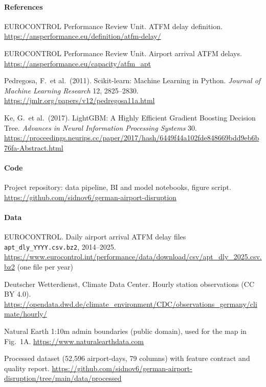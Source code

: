 \documentclass[10pt,a4paper,epsf,apalike]{article}
\newcommand{\repo}{https://github.com/sidnov6/german-airport-disruption}
\begin{document}
\paragraph{References}
\begin{enumerate}[label={[\arabic*]}]
\item EUROCONTROL Performance Review Unit. ATFM delay definition. \url{https://ansperformance.eu/definition/atfm-delay/}
\item EUROCONTROL Performance Review Unit. Airport arrival ATFM delays. \url{https://ansperformance.eu/capacity/atfm_apt}
\item Pedregosa, F.\ et al.\ (2011). Scikit-learn: Machine Learning in Python. \textit{Journal of Machine Learning Research} 12, 2825--2830. \url{https://jmlr.org/papers/v12/pedregosa11a.html}
\item Ke, G.\ et al.\ (2017). LightGBM: A Highly Efficient Gradient Boosting Decision Tree. \textit{Advances in Neural Information Processing Systems} 30. \url{https://proceedings.neurips.cc/paper/2017/hash/6449f44a102fde848669bdd9eb6b76fa-Abstract.html}
\end{enumerate}

\paragraph{Code}
\begin{enumerate}[label={[\arabic*]}]
\item Project repository: data pipeline, BI and model notebooks, figure script. \url{\repo}
\end{enumerate}

\paragraph{Data}
\begin{enumerate}[label={[\arabic*]}]
\item EUROCONTROL. Daily airport arrival ATFM delay files \texttt{apt\_dly\_YYYY.csv.bz2}, 2014--2025. \url{https://www.eurocontrol.int/performance/data/download/csv/apt_dly_2025.csv.bz2} (one file per year)
\item Deutscher Wetterdienst, Climate Data Center. Hourly station observations (CC BY 4.0). \url{https://opendata.dwd.de/climate_environment/CDC/observations_germany/climate/hourly/}
\item Natural Earth 1:10m admin boundaries (public domain), used for the map in Fig.~1A. \url{https://www.naturalearthdata.com}
\item Processed dataset (52,596 airport-days, 79 columns) with feature contract and quality report. \url{\repo/tree/main/data/processed}
\end{enumerate}
\end{document}
